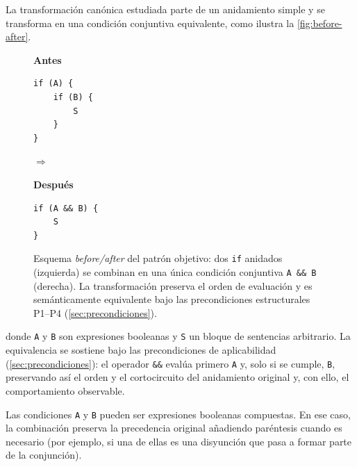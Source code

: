 La transformación canónica estudiada parte de un anidamiento simple y se
transforma en una condición conjuntiva equivalente, como ilustra la
\autoref{fig:before-after}.

\begin{figure}[ht]
\centering
\begin{minipage}[c]{0.44\linewidth}
\centering
\textbf{Antes}\par\smallskip
\begin{lstlisting}[numbers=none]
if (A) {
    if (B) {
        S
    }
}
\end{lstlisting}
\end{minipage}%
\begin{minipage}[c]{0.10\linewidth}
\centering$\Longrightarrow$
\end{minipage}%
\begin{minipage}[c]{0.44\linewidth}
\centering
\textbf{Después}\par\smallskip
\begin{lstlisting}[numbers=none]
if (A && B) {
    S
}
\end{lstlisting}
\end{minipage}
\caption{Esquema \emph{before/after} del patrón objetivo: dos \texttt{if}
anidados (izquierda) se combinan en una única condición conjuntiva
\lstinline|A && B| (derecha). La transformación preserva el orden de
evaluación y es semánticamente equivalente bajo las precondiciones
estructurales P1--P4 (\autoref{sec:precondiciones}).}
\label{fig:before-after}
\end{figure}

\noindent donde \lstinline|A| y \lstinline|B| son expresiones booleanas y
\lstinline|S| un bloque de sentencias arbitrario. La equivalencia se sostiene
bajo las precondiciones de aplicabilidad (\autoref{sec:precondiciones}): el
operador \lstinline|&&| evalúa primero \lstinline|A| y, solo si se cumple,
\lstinline|B|, preservando así el orden y el cortocircuito del anidamiento
original y, con ello, el comportamiento observable.

Las condiciones \lstinline|A| y \lstinline|B| pueden ser expresiones booleanas
compuestas. En ese caso, la combinación preserva la precedencia original
añadiendo paréntesis cuando es necesario (por ejemplo, si una de ellas es una
disyunción que pasa a formar parte de la conjunción).

